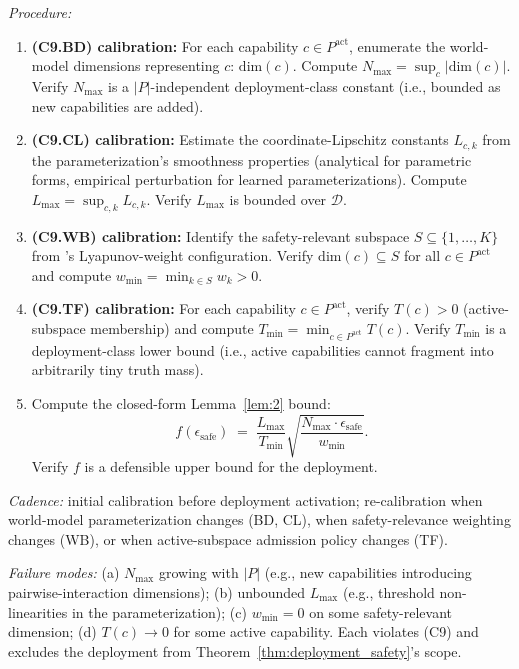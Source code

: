 \emph{Procedure:}
\begin{enumerate}
\item \textbf{(C9.BD) calibration:} For each capability $c \in
  P^{\mathrm{act}}$, enumerate the world-model dimensions
  representing $c$: $\mathrm{dim}(c)$.  Compute $N_{\max} = \sup_c
  |\mathrm{dim}(c)|$.  Verify $N_{\max}$ is a $|P|$-independent
  deployment-class constant (i.e., bounded as new capabilities are
  added).
\item \textbf{(C9.CL) calibration:} Estimate the coordinate-Lipschitz
  constants $L_{c,k}$ from the parameterization's smoothness
  properties (analytical for parametric forms, empirical perturbation
  for learned parameterizations).  Compute $L_{\max} = \sup_{c,k}
  L_{c,k}$.  Verify $L_{\max}$ is bounded over $\mathcal{D}$.
\item \textbf{(C9.WB) calibration:} Identify the safety-relevant
  subspace $S \subseteq \{1, \ldots, K\}$ from
  \citep[Phase~Redundancy]{lasser2026phase}'s Lyapunov-weight
  configuration.  Verify $\mathrm{dim}(c) \subseteq S$ for all $c
  \in P^{\mathrm{act}}$ and compute $w_{\min} = \min_{k \in S} w_k
  > 0$.
\item \textbf{(C9.TF) calibration:} For each capability $c \in
  P^{\mathrm{act}}$, verify $T(c) > 0$ (active-subspace
  membership) and compute $T_{\min} = \min_{c \in P^{\mathrm{act}}}
  T(c)$.  Verify $T_{\min}$ is a deployment-class lower bound
  (i.e., active capabilities cannot fragment into arbitrarily tiny
  truth mass).
\item Compute the closed-form Lemma~\ref{lem:2} bound:
  \[
    f(\epsilon_{\mathrm{safe}}) \;=\; \frac{L_{\max}}{T_{\min}}
    \sqrt{\frac{N_{\max} \cdot \epsilon_{\mathrm{safe}}}{w_{\min}}}.
  \]
  Verify $f$ is a defensible upper bound for the deployment.
\end{enumerate}

\emph{Cadence:} initial calibration before deployment activation;
re-calibration when world-model parameterization changes (BD, CL),
when safety-relevance weighting changes (WB), or when active-subspace
admission policy changes (TF).

\emph{Failure modes:} (a) $N_{\max}$ growing with $|P|$ (e.g., new
capabilities introducing pairwise-interaction dimensions); (b)
unbounded $L_{\max}$ (e.g., threshold non-linearities in the
parameterization); (c) $w_{\min} = 0$ on some safety-relevant
dimension; (d) $T(c) \to 0$ for some active capability.  Each
violates (C9) and excludes the deployment from
Theorem~\ref{thm:deployment_safety}'s scope.

